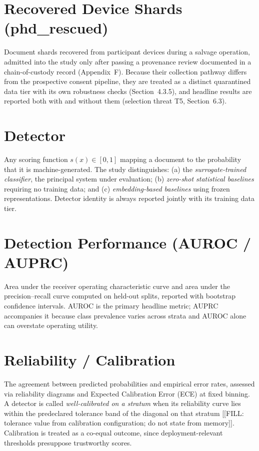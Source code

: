 \section{Recovered Device Shards (phd\_rescued)}
Document shards recovered from participant devices during a salvage
operation, admitted into the study only after passing a provenance review
documented in a chain-of-custody record (Appendix~F). Because their
collection pathway differs from the prospective consent pipeline, they are
treated as a distinct quarantined data tier with its own robustness checks
(Section~4.3.5), and headline results are reported both with and without
them (selection threat T5, Section~6.3).

\section{Detector}
Any scoring function $s(x)\!\in\![0,1]$ mapping a document to the
probability that it is machine-generated. The study distinguishes:
(a) the \emph{surrogate-trained classifier}, the principal system under
evaluation; (b) \emph{zero-shot statistical baselines} requiring no
training data; and (c) \emph{embedding-based baselines} using frozen
representations. Detector identity is always reported jointly with its
training data tier.

\section{Detection Performance (AUROC / AUPRC)}
Area under the receiver operating characteristic curve and area under the
precision--recall curve computed on held-out splits, reported with bootstrap
confidence intervals. AUROC is the primary headline metric; AUPRC
accompanies it because class prevalence varies across strata and AUROC
alone can overstate operating utility.

\section{Reliability / Calibration}
The agreement between predicted probabilities and empirical error rates,
assessed via reliability diagrams and Expected Calibration Error (ECE) at
fixed binning. A detector is called \emph{well-calibrated on a stratum}
when its reliability curve lies within the predeclared tolerance band of
the diagonal on that stratum [[FILL: tolerance value from calibration
configuration; do not state from memory]]. Calibration is treated as a
co-equal outcome, since deployment-relevant thresholds presuppose
trustworthy scores.

